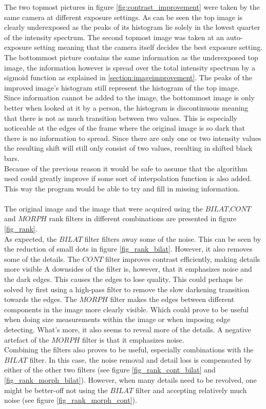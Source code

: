 The two topmost pictures in figure \ref{fig:contrast_improvement} were taken by the same camera at different exposure settings. As can be seen the top image is clearly underexposed as the peaks of its histogram lie solely in the lowest quarter of the intensity spectrum. The second topmost image was taken at an auto-exposure setting meaning that the camera itself decides the best exposure setting. The bottommost picture contains the same information as the underexposed top image, the information however is spread over the total intensity spectrum by a sigmoid function as explained in \ref{section:imageimprovement}. The peaks of the improved image's histogram still represent the histogram of the top image.\\
Since information cannot be added to the image, the bottommost image is only better when looked at it by a person, the histogram is discontinuous meaning that there is not as much transition between two values. This is especially noticeable at the edges of the frame where the original image is so dark that there is no information to spread. Since there are only one or two intensity values the resulting shift will still only consist of two values, resulting in shifted black bars.\\
Because of the previous reason it would be safe to assume that the algorithm used could greatly improve if some sort of interpolation function is also added. This way the program would be able to try and fill in missing information.\\
\\
The original image and the image that were acquired using the $BILAT$,$CONT$ and $MORPH$ rank filters in different combinations are presented in figure \ref{fig_rank}.\\
As expected, the $BILAT$ filter filters away some of the noise. This can be seen by the reduction of small dots in figure \ref{fig_rank_bilat}. However, it also removes some of the details. The $CONT$ filter improves contrast efficiently, making details more visible A downsides of the filter is, however, that it emphasizes noise and the dark edges. This causes the edges to lose quality. This could perhaps be solved by first using a high-pass filter to remove the slow darkening transition towards the edges. The $MORPH$ filter makes the edges between different components in the image more clearly visible. Which could prove to be useful when doing size measurements within the image or when imposing edge detecting. What's more, it also seems to reveal more of the details. A negative artefact of the $MORPH$ filter is that it emphasizes noise. \\
Combining the filters also proves to be useful, especially combinations with the $BILAT$ filter. In this case, the noise removal and detail loss is compensated by either of the other two filters (see figure \ref{fig_rank_cont_bilat} and \ref{fig_rank_morph_bilat}). However, when many details need to be revolved, one might be better-off not using the $BILAT$ filter and accepting relatively much noise (see figure \ref{fig_rank_morph_cont}).

